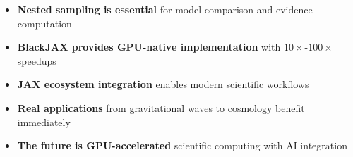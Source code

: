 \documentclass[aspectratio=169]{beamer}
\begin{document}
\begin{frame}
    \begin{itemize}
        \item \textbf{Nested sampling is essential} for model comparison and evidence computation
        \item \textbf{BlackJAX provides GPU-native implementation} with $10\times$-$100\times$ speedups
        \item \textbf{JAX ecosystem integration} enables modern scientific workflows
        \item \textbf{Real applications} from gravitational waves to cosmology benefit immediately
        \item \textbf{The future is GPU-accelerated} scientific computing with AI integration
    \end{itemize}
\end{frame}

\appendix
\end{document}
